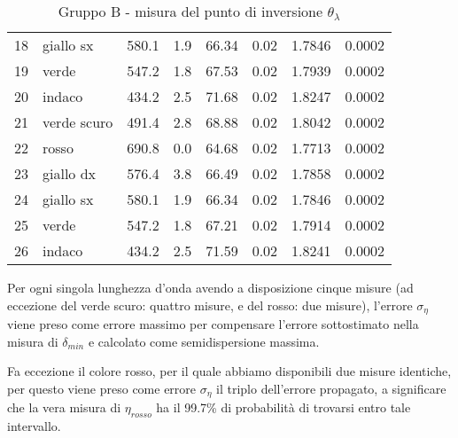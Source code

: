 \begin{table}[!htbp]
{\begin{tabular}{clcccrcc}
        18  &   giallo sx    &   580.1  & 1.9 &  66.34 &   0.02  & 1.7846 & 0.0002  \\
        19  &   verde        &   547.2  & 1.8 &  67.53 &   0.02  & 1.7939 & 0.0002  \\
        20  &   indaco       &   434.2  & 2.5 &  71.68 &   0.02  & 1.8247 & 0.0002  \\
        21  &   verde scuro  &   491.4  & 2.8 &  68.88 &   0.02  & 1.8042 & 0.0002  \\
        22  &   rosso        &   690.8  & 0.0 &  64.68 &   0.02  & 1.7713 & 0.0002  \\
        23  &   giallo dx    &   576.4  & 3.8 &  66.49 &   0.02  & 1.7858 & 0.0002  \\
        24  &   giallo sx    &   580.1  & 1.9 &  66.34 &   0.02  & 1.7846 & 0.0002  \\
        25  &   verde        &   547.2  & 1.8 &  67.21 &   0.02  & 1.7914 & 0.0002  \\
        26  &   indaco       &   434.2  & 2.5 &  71.59 &   0.02  & 1.8241 & 0.0002  \\
        \hline
    \end{tabular}
    \par}
    \caption{Gruppo B - misura del punto di inversione $\theta_{\lambda}$}
\end{table}

Per ogni singola lunghezza d'onda avendo a disposizione cinque misure (ad eccezione del verde scuro: quattro misure, e del rosso: due misure), l'errore $\sigma_{\eta}$ viene preso come errore massimo per compensare l'errore sottostimato nella misura di $\delta_{min}$ e calcolato come semidispersione massima.

Fa eccezione il colore rosso, per il quale abbiamo disponibili due misure identiche, per questo viene preso come errore $\sigma_{\eta}$ il triplo dell'errore propagato, a significare che la vera misura di $\eta_{rosso}$ ha il 99.7\% di probabilità di trovarsi entro tale intervallo.

